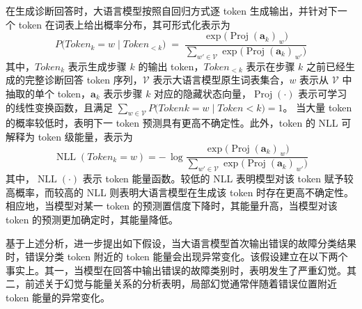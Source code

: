 在生成诊断回答时，大语言模型按照自回归方式逐 token 生成输出，并针对下一个 token 在词表上给出概率分布，其可形式化表示为
% 
\begin{equation}
	P\bigl(\mathit{Token}_{k} = w \;\big|\; \mathit{Token}_{<k}\bigr)
	\;=\;
	\frac{\exp\bigl(\operatorname{Proj}(\bm{a}_{k})_{\,w}\bigr)}
	{\displaystyle \sum_{w' \in \mathcal{V}} 
		\exp\bigl(\operatorname{Proj}(\bm{a}_{k})_{\,w'}\bigr)}
\end{equation}
% 
其中，$\mathit{Token}_{k}$ 表示生成步骤 $k$ 的输出 token，$\mathit{Token}_{<k}$ 表示在步骤 $k$ 之前已经生成的完整诊断回答 token 序列，$\mathcal{V}$ 表示大语言模型原生词表集合，$w$ 表示从 $\mathcal{V}$ 中抽取的单个 token，$\bm{a}_{k}$ 表示步骤 $k$ 对应的隐藏状态向量，$\operatorname{Proj}(\cdot)$ 表示可学习的线性变换函数，且满足 $\sum_{w\in \mathcal{V}} P\bigl(\mathit{Token}{k} = w \mid \mathit{Token}{<k}\bigr) = 1$。
当大量 token 的概率较低时，表明下一 token 预测具有更高不确定性。此外，token 的 NLL 可解释为 token 级能量，表示为
\begin{equation}
	\operatorname{NLL}{(\mathit{Token}_{k}=w)}
	=
	-\,\log
	\frac{\exp\bigl(\operatorname{Proj}(\bm{a}_{k})_{\,w}\bigr)}
	{\displaystyle\sum_{w' \in \mathcal{V}}
		\exp\bigl(\operatorname{Proj}(\bm{a}_{k})_{\,w'}\bigr)}
\end{equation}
% 
其中，$\operatorname{NLL}{(\cdot)}$ 表示 token 能量函数。较低的 NLL 表明模型对该 token 赋予较高概率，而较高的 NLL 则表明大语言模型在生成该 token 时存在更高不确定性。相应地，当模型对某一 token 的预测置信度下降时，其能量升高，当模型对该 token 的预测更加确定时，其能量降低。

基于上述分析，进一步提出如下假设，当大语言模型首次输出错误的故障分类结果时，错误分类 token 附近的 token 能量会出现异常变化。该假设建立在以下两个事实上。其一，当模型在回答中输出错误的故障类别时，表明发生了严重幻觉。其二，前述关于幻觉与能量关系的分析表明，局部幻觉通常伴随着错误位置附近 token 能量的异常变化。

